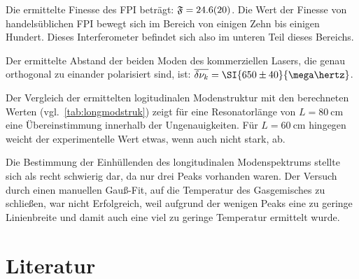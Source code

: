 \documentclass[slug=GL, room=HZDR\ Dresden/Rossendorf\,\ Geb.\ 620/123, supervisor=Tim\ Ziegler]{../../Lab_Report_LaTeX/lab_report}
\begin{document}
Die ermittelte Finesse des FPI beträgt: \(\mathfrak{F}=\SI{24.6\pm
2.0}{}\). Die Wert der Finesse von handelsüblichen FPI bewegt sich im
Bereich von einigen Zehn bis einigen Hundert. Dieses Interferometer
befindet sich also im unteren Teil dieses Bereichs.

Der ermittelte Abstand der beiden Moden des kommerziellen Lasers, die
genau orthogonal zu einander polarisiert sind, ist:
\(\overline{\delta\nu_k}=\SI{650\pm 40}{\mega\hertz}\).

Der Vergleich der ermittelten logitudinalen Modenstruktur mit den
berechneten Werten (vgl.~\ref{tab:longmodstruk}) zeigt für eine
Resonatorlänge von \(L=\SI{80}{\centi\meter}\) eine Übereinstimmung
innerhalb der Ungenauigkeiten.  Für \(L=\SI{60}{\centi\meter}\)
hingegen weicht der experimentelle Wert etwas, wenn auch nicht stark,
ab.

Die Bestimmung der Einhüllenden des longitudinalen Modenspektrums
stellte sich als recht schwierig dar, da nur drei Peaks vorhanden
waren. Der Versuch durch einen manuellen Gauß-Fit, auf die Temperatur
des Gasgemisches zu schließen, war nicht Erfolgreich, weil aufgrund
der wenigen Peaks eine zu geringe Linienbreite und damit auch eine
viel zu geringe Temperatur ermittelt wurde.


\section{Literatur}
\label{sec:literatur}

\printbibliography
\end{document}
